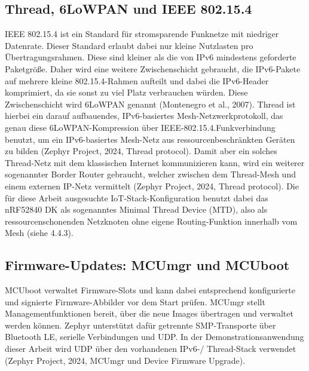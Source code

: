 \subsection{Thread, 6LoWPAN und IEEE 802.15.4}
IEEE 802.15.4 ist ein Standard f{\"u}r stromsparende Funknetze mit niedriger Datenrate. Dieser Standard erlaubt dabei nur kleine Nutzlasten pro {\"U}bertragungsrahmen. Diese sind kleiner als die von IPv6 mindestens geforderte Paketgr{\"o}{\ss}e. Daher wird eine weitere Zwischenschicht gebraucht, die IPv6-Pakete auf mehrere kleine 802.15.4-Rahmen aufteilt und dabei die IPv6-Header komprimiert, da sie sonst zu viel Platz verbrauchen w{\"u}rden. Diese Zwischenschicht wird 6LoWPAN genannt (Montenegro et al., 2007). Thread ist hierbei ein darauf aufbauendes, IPv6-basiertes Mesh-Netzwerkprotokoll, das genau diese 6LoWPAN-Kompression {\"u}ber IEEE-802.15.4.Funkverbindung benutzt, um ein IPv6-basiertes Mesh-Netz aus ressourcenbeschr{\"a}nkten Ger{\"a}ten zu bilden (Zephyr Project, 2024, \glqq{}Thread protocol\grqq{}). Damit aber ein solches Thread-Netz mit dem klassischen Internet kommunizieren kann, wird ein weiterer sogenannter Border Router gebraucht, welcher zwischen dem Thread-Mesh und einem externen IP-Netz vermittelt (Zephyr Project, 2024, \glqq{}Thread protocol\grqq{}). Die f{\"u}r diese Arbeit ausgesuchte IoT-Stack-Konfiguration benutzt dabei das nRF52840 DK als sogenanntes Minimal Thread Device (MTD), also als ressourcenschonenden Netzknoten ohne eigene Routing-Funktion innerhalb vom Mesh (siehe 4.4.3).

\subsection{Firmware-Updates: MCUmgr und MCUboot}
MCUboot verwaltet Firmware-Slots und kann dabei entsprechend konfigurierte und signierte Firmware-Abbilder vor dem Start pr{\"u}fen. MCUmgr stellt Managementfunktionen bereit, {\"u}ber die neue Images {\"u}bertragen und verwaltet werden k{\"o}nnen. Zephyr unterst{\"u}tzt daf{\"u}r getrennte SMP-Transporte {\"u}ber Bluetooth LE, serielle Verbindungen und UDP. In der Demonstrationsanwendung dieser Arbeit wird UDP {\"u}ber den vorhandenen IPv6-/ Thread-Stack verwendet (Zephyr Project, 2024, \glqq{}MCUmgr\grqq{} und \glqq{}Device Firmware Upgrade\grqq{}).
